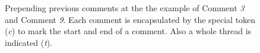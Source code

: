 \begin{figure}
    \centering
    \caption{Prepending previous comments at the the example of Comment \textit{3} and Comment \textit{9}. Each comment is encapsulated by the special token (\textit{c}) to mark the start and end of a comment. Also a whole thread is indicated (\textit{t}).}
    \label{fig:approach_1}
\end{figure}

